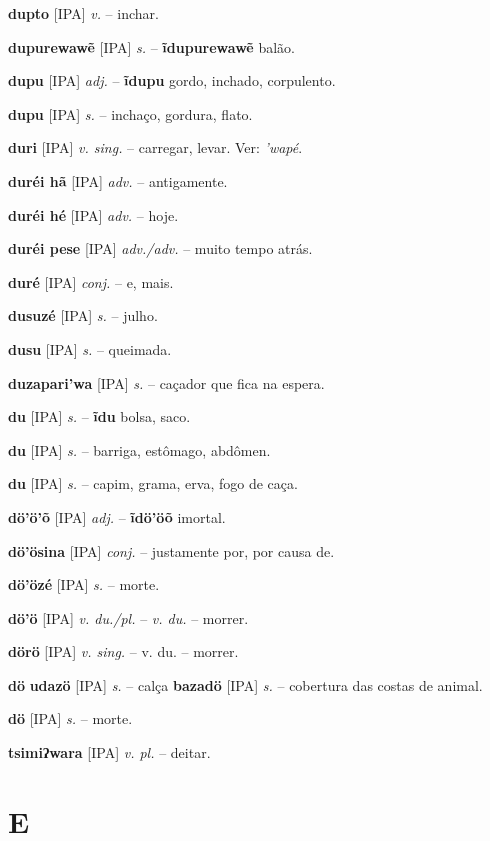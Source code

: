 \textbf{dupto} [IPA] \textit{v.} -- inchar.

\textbf{dupurewawẽ} [IPA] \textit{s.} -- \textbf{ĩdupurewawẽ} balão.

\textbf{dupu} [IPA] \textit{adj.} -- \textbf{ĩdupu} gordo, inchado, corpulento.

\textbf{dupu} [IPA] \textit{s.} -- inchaço, gordura, flato.

\textbf{duri} [IPA] \textit{v. sing.} -- carregar, levar. Ver: \textit{'wapé}.

\textbf{duréi hã} [IPA] \textit{adv.} -- antigamente.

\textbf{duréi hé} [IPA] \textit{adv.} -- hoje.

\textbf{duréi pese} [IPA] \textit{adv./adv.} -- muito tempo atrás.

\textbf{duré} [IPA] \textit{conj.} -- e, mais.

\textbf{dusuzé} [IPA] \textit{s.} -- julho.

\textbf{dusu} [IPA] \textit{s.} -- queimada.

\textbf{duzapari'wa} [IPA] \textit{s.} -- caçador que fica na espera.

\textbf{du} [IPA] \textit{s.} -- \textbf{ĩdu} bolsa, saco.

\textbf{du} [IPA] \textit{s.} -- barriga, estômago, abdômen.

\textbf{du} [IPA] \textit{s.} -- capim, grama, erva, fogo de caça.

\textbf{dö'ö'õ} [IPA] \textit{adj.} -- \textbf{ĩdö'öõ} imortal.

\textbf{dö'ösina} [IPA] \textit{conj.} -- justamente por, por causa de.

\textbf{dö'özé} [IPA] \textit{s.} -- morte.

\textbf{dö'ö} [IPA] \textit{v. du./pl.} -- \textit{v. du.} -- morrer.

\textbf{dörö} [IPA] \textit{v. sing.} -- v. du. -- morrer.

\textbf{dö}  \textbf{udazö} [IPA] \textit{s.} -- calça  \textbf{bazadö} [IPA] \textit{s.} -- cobertura das costas de animal.

\textbf{dö} [IPA] \textit{s.} -- morte.

\textbf{tsimiʔwara} [IPA] \textit{v. pl.} -- deitar.



\section*{E}



